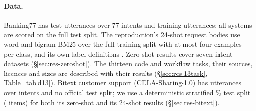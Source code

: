 \paragraph{Data.} Banking77 \citep{casanueva-etal-2020-efficient} has \fsN{} test utterances over 77 intents and
\fsFullTrain{} training utterances; all systems are scored on the full test split. The reproduction's 24-shot
request bodies use word and bigram BM25 over the full training split with at most four examples per class, and its
own label definitions \citep{smith-2026-jev-banking77}. Zero-shot results cover seven intent datasets
(\S\ref{sec:res-zeroshot}).
The thirteen code and workflow tasks, their sources, licences and sizes are described with their results
(\S\ref{sec:res-13task}, Table~\ref{tab:d13}).
Bitext customer support \citep{bitext-2023-customer-support} (CDLA-Sharing-1.0) has \btTotalN{} utterances over %
\btK{} intents and no official test split; we use a deterministic stratified \btTestPct\% test split (\btN{} items)
for both its zero-shot and its 24-shot results (\S\ref{sec:res-bitext}).

\begin{table}[t]
\centering\small
\caption{Documented exposure of zero-shot systems to each dataset's training data. C = clean in every disclosed
training list; X = training split present; I = indirect (HWU64 and MASSIVE share utterances); ? = undisclosed.}
\label{tab:exposure}
\end{table}
